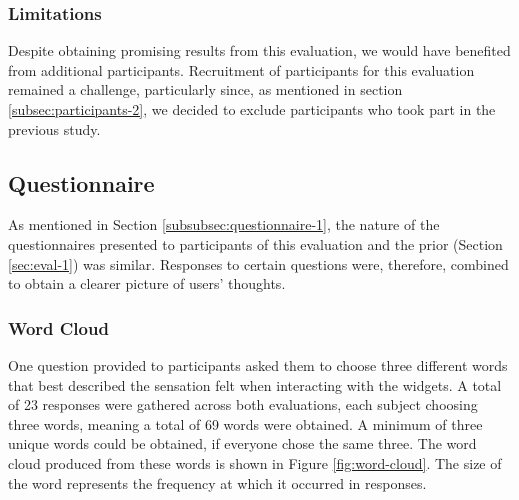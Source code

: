 \documentclass{mpaper}
\begin{document}
\subsubsection{Limitations}
Despite obtaining promising results from this evaluation, we would have benefited from additional participants. Recruitment of participants for this evaluation remained a challenge, particularly since, as mentioned in section \ref{subsec:participants-2}, we decided to exclude participants who took part in the previous study.

\subsection{Questionnaire}\label{subsec:questionnaire-1-2}
As mentioned in Section \ref{subsubsec:questionnaire-1}, the nature of the questionnaires presented to participants of this evaluation and the prior (Section \ref{sec:eval-1}) was similar. Responses to certain questions were, therefore, combined to obtain a clearer picture of users' thoughts.

\subsubsection{Word Cloud} \label{subsubsec:word-cloud-1-2}
One question provided to participants asked them to choose three different words that best described the sensation felt when interacting with the widgets. A total of 23 responses were gathered across both evaluations, each subject choosing three words, meaning a total of 69 words were obtained. A minimum of three unique words could be obtained, if everyone chose the same three. The word cloud produced from these words is shown in Figure \ref{fig:word-cloud}. The size of the word represents the frequency at which it occurred in responses.
\end{document}
